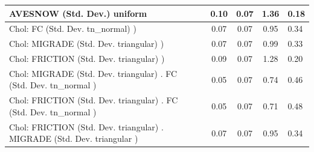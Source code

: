 \begin{table}
\begin{center}
\begin{tabular}{|l|l|c|c|c|l|}
			\hline
			AVESNOW (Std. Dev.) uniform &  & 0.10 & 0.07 & 1.36 & 0.18 \\
			\hline
			 Chol: FC (Std. Dev. tn_normal) ) &  & 0.07 & 0.07 & 0.95 & 0.34 \\
			\hline
			 Chol: MIGRADE (Std. Dev. triangular) ) &  & 0.07 & 0.07 & 0.99 & 0.33 \\
			\hline
			 Chol: FRICTION (Std. Dev. triangular) ) &  & 0.09 & 0.07 & 1.28 & 0.20 \\
			\hline
			 Chol: MIGRADE (Std. Dev. triangular) . FC (Std. Dev.   tn_normal ) &  & 0.05 & 0.07 & 0.74 & 0.46 \\
			\hline
			 Chol: FRICTION (Std. Dev. triangular) . FC (Std. Dev.   tn_normal ) &  & 0.05 & 0.07 & 0.71 & 0.48 \\
			\hline
			 Chol: FRICTION (Std. Dev. triangular) . MIGRADE (Std. Dev.   triangular ) &  & 0.07 & 0.07 & 0.95 & 0.34 \\
			\hline
		\end{tabular}
	\end{center}
\end{table}